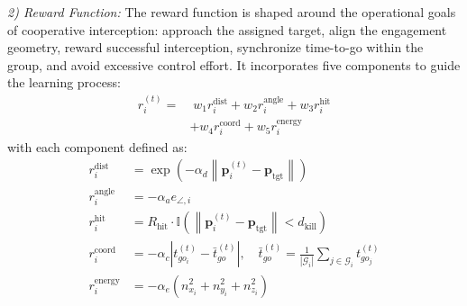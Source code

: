 \documentclass[lettersize,journal]{IEEEtran}
\providecommand{\DIFaddbegin}{} %
\providecommand{\DIFaddend}{} %
\providecommand{\DIFdelbegin}{} %
\providecommand{\DIFdelend}{} %
\begin{document}
\emph{2) Reward Function:} The reward function is shaped around the operational goals of cooperative interception: approach the assigned target, align the engagement geometry, reward successful interception, synchronize time-to-go within the group, and avoid excessive control effort. It incorporates five components to guide the learning process:
\begin{equation}
\label{eq:reward_function}
\begin{split}
r_i^{(t)} =& \; w_1 r_i^{\text{dist}} + w_2 r_i^{\text{angle}} + w_3 r_i^{\text{hit}} \\
&+ w_4 r_i^{\text{coord}} + w_5 r_i^{\text{energy}}
\end{split}
\end{equation}
with each component defined as:
\DIFdelbegin %
\DIFdelend \DIFaddbegin \begin{align}
r_i^{\text{dist}} &= \exp\!\left(-\alpha_d \left\|\mathbf{p}_i^{(t)} - \mathbf{p}_{\text{tgt}}\right\|\right) \label{eq:r_dist}\\
r_i^{\text{angle}} &= -\alpha_a e_{\angle,i} \label{eq:r_angle}\\
r_i^{\text{hit}} &= R_{\text{hit}} \cdot \mathbb{I}\!\left(\left\|\mathbf{p}_i^{(t)} - \mathbf{p}_{\text{tgt}}\right\| < d_{\text{kill}}\right) \label{eq:r_hit}\\
r_i^{\text{coord}} &= -\alpha_c \left| t_{go_i}^{(t)} - \bar{t}_{go}^{(t)} \right|, \quad \bar{t}_{go}^{(t)} = \frac{1}{|\mathcal{G}_i|}\sum_{j \in \mathcal{G}_i} t_{go_j}^{(t)} \label{eq:r_coord}\\
r_i^{\text{energy}} &= -\alpha_e \left(n_{x_i}^2 + n_{y_i}^2+n_{z_i}^2\right) \label{eq:r_energy}
\end{align}\DIFaddend 
\end{document}
